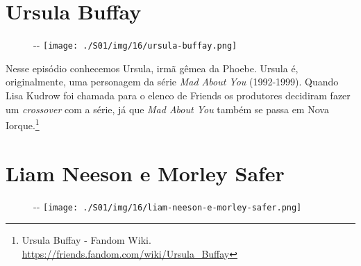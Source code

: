 \hypertarget{ursula-buffay}{%
\section{Ursula Buffay}\label{ursula-buffay}}

\begin{figure}[!ht]
  \begin{adjustwidth}{-\oddsidemargin-1in}{-\rightmargin}
    \centering
    \texttt{[image: ./S01/img/16/ursula-buffay.png]}
  \end{adjustwidth}
\end{figure}

Nesse episódio conhecemos Ursula, irmã gêmea da Phoebe. Ursula é,
originalmente, uma personagem da série \emph{Mad About You} (1992-1999).
Quando Lisa Kudrow foi chamada para o elenco de Friends os produtores
decidiram fazer um \emph{crossover} com a série, já que \emph{Mad About
You} também se passa em Nova Iorque.\footnote{\sloppy Ursula Buffay - Fandom Wiki. \url{https://friends.fandom.com/wiki/Ursula_Buffay}}

\hypertarget{liam-neeson-e-morley-safer}{%
\section{Liam Neeson e Morley Safer}\label{liam-neeson-e-morley-safer}}

\begin{figure}[!ht]
  \begin{adjustwidth}{-\oddsidemargin-1in}{-\rightmargin}
    \centering
    \texttt{[image: ./S01/img/16/liam-neeson-e-morley-safer.png]}
  \end{adjustwidth}
\end{figure}

